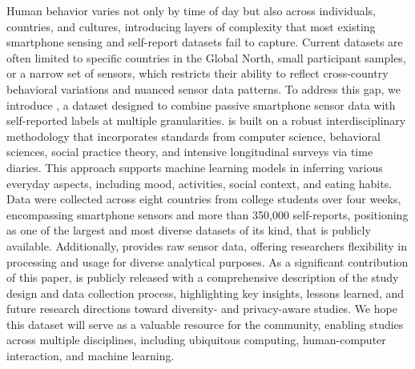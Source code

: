 Human behavior varies not only by time of day but also across individuals, countries, and cultures, introducing layers of complexity that most existing smartphone sensing and self-report datasets fail to capture. Current datasets are often limited to specific countries in the Global North, small participant samples, or a narrow set of sensors, which restricts their ability to reflect cross-country behavioral variations and nuanced sensor data patterns. To address this gap, we introduce \dataset, a dataset designed to combine passive smartphone sensor data with self-reported labels at multiple granularities. \dataset is built on a robust interdisciplinary methodology that incorporates standards from computer science, behavioral sciences, social practice theory, and intensive longitudinal surveys via time diaries. This approach supports machine learning models in inferring various everyday aspects, including mood, activities, social context, and eating habits. Data were collected across eight countries from \nilogusers college students over four weeks, encompassing \nsensors smartphone sensors and more than 350,000 self-reports, positioning \dataset as one of the largest and most diverse datasets of its kind, that is publicly available. Additionally, \dataset provides raw sensor data, offering researchers flexibility in processing and usage for diverse analytical purposes. As a significant contribution of this paper, \dataset is publicly released with a comprehensive description of the study design and data collection process, highlighting key insights, lessons learned, and future research directions toward diversity- and privacy-aware studies. We hope this dataset will serve as a valuable resource for the community, enabling studies across multiple disciplines, including ubiquitous computing, human-computer interaction, and machine learning. 



